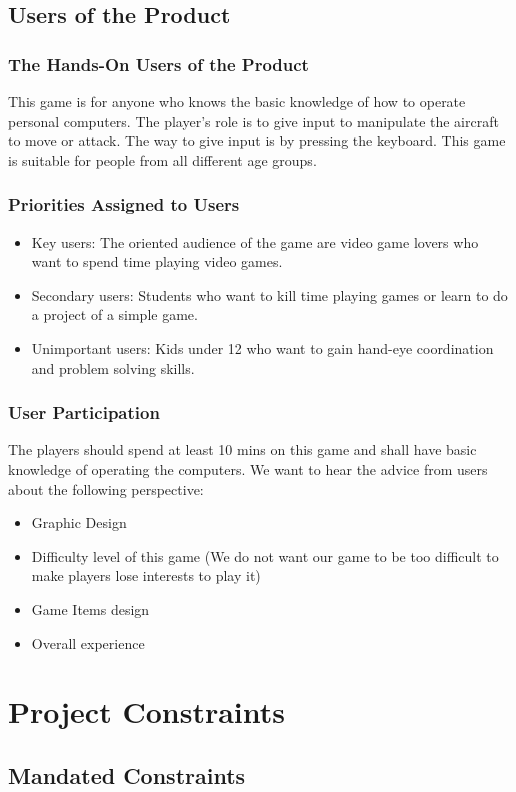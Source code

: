 \documentclass[12pt]{article}
\begin{document}
\subsection{Users of the Product}
\subsubsection{The Hands-On Users of the Product}
This game is for anyone who knows the basic knowledge of how to operate personal computers. The player’s role is to give input to manipulate the aircraft to move or attack. The way to give input is by pressing the keyboard. This game is suitable for people from all different age groups.
\subsubsection{Priorities Assigned to Users}
\begin{itemize}
\item Key users: The oriented audience of the game are video game lovers  who want to spend time playing video games.
\item Secondary users: Students who want to kill time playing games or learn to do a project of a simple game.
\item Unimportant users: Kids under 12 who want to gain hand-eye coordination and problem solving skills.
\end{itemize}
\subsubsection{User Participation}
The players should spend at least 10 mins on this game and shall have basic knowledge of operating the computers. We want to
hear the advice from users about the following perspective:
\begin{itemize}
\item Graphic Design
\item Difficulty level of this game (We do not want our game
to be too difficult to make players lose interests to play it)
\item Game Items design
\item Overall experience
\end{itemize}
\section{Project Constraints}
\subsection{Mandated Constraints}
\end{document}
